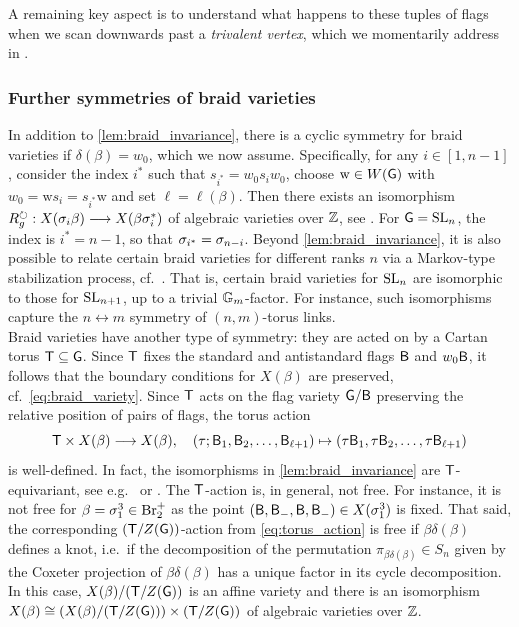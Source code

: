 A remaining key aspect is to understand what happens to these tuples of flags when we scan downwards past a {\it trivalent vertex}, which we momentarily address in . 

\subsubsection{Further symmetries of braid varieties}\label{sssec:braid_variety_further_symmetries} In addition to \cref{lem:braid_invariance}, there is a cyclic symmetry for braid varieties if $\delta(\beta)=w_0$, which we now assume. Specifically, for any $i\in[1,n-1]$, consider the index $i^*$ such that $s_{i^*}=w_0s_iw_0$, choose $\mathrm{w}\in W(\mathsf{G})$ with $w_0=\mathrm{w}s_{i}=s_{i^*}\mathrm{w}$ and set $\ell=\ell(\beta)$. Then there exists an isomorphism $R_g^\circlearrowright:X(\sigma_i\beta)\longrightarrow X(\beta \sigma^*_i)$ of algebraic varieties over $\mathbb{Z}$, see \cite[Section 5.5]{CGGLSS25}. For $\mathsf{G}=\operatorname{SL}_n$, the index is $i^*=n-1$, so that $\sigma_{i^*}=\sigma_{n-i}$. Beyond \cref{lem:braid_invariance}, it is also possible to relate certain braid varieties for different ranks $n$ via a Markov-type stabilization process, cf.~\cite[Section 3.2]{CGGS2}. That is, certain braid varieties for $\operatorname{SL}_n$ are isomorphic to those for $\operatorname{SL}_{n+1}$, up to a trivial $\mathbb{G}_m$-factor. For instance, such isomorphisms capture the $n\leftrightarrow m$ symmetry of $(n,m)$-torus links.\\

Braid varieties have another type of symmetry: they are acted on by a Cartan torus $\mathsf{T}\subseteq\mathsf{G}$. Since $\mathsf{T}$ fixes the standard and antistandard flags $\mathsf{B}$ and $w_0\mathsf{B}$, it follows that the boundary conditions for $X(\beta)$ are preserved, cf.~\cref{eq:braid_variety}. Since $\mathsf{T}$ acts on the flag variety $\mathsf{G}/\mathsf{B}$ preserving the relative position of pairs of flags, the torus action
\begin{equation}\label{eq:torus_action}
\mathsf{T}\times X(\beta)\longrightarrow X(\beta),\quad (\tau;\mathsf{B}_1,\mathsf{B}_2,\dots, \mathsf{B}_{\ell+1})\mapsto (\tau\mathsf{B}_1,\tau\mathsf{B}_2,\dots, \tau\mathsf{B}_{\ell+1})
\end{equation}
is well-defined. In fact, the isomorphisms in \cref{lem:braid_invariance} are $\mathsf{T}$-equivariant, see e.g.~\cite[Section 2.2]{CGGJ24} or \cite[Section 4.5]{CGSS_clusterdeeploci}. The $\mathsf{T}$-action is, in general, not free. For instance, it is not free for $\beta=\sigma_1^3\in\mbox{Br}_2^+$ as the point $(\mathsf{B},\mathsf{B}_-,\mathsf{B},\mathsf{B}_-)\in X(\sigma_1^3)$ is fixed. That said, the corresponding $(\mathsf{T}/Z(\mathsf{G}))$-action from \cref{eq:torus_action} is free if $\beta\delta(\beta)$ defines a knot, i.e.~if the decomposition of the permutation $\pi_{\beta\delta(\beta)}\in S_n$ given by the Coxeter projection of $\beta\delta(\beta)$ has a unique factor in its cycle decomposition. In this case, $X(\beta)/(\mathsf{T}/Z(\mathsf{G}))$ is an affine variety and there is an isomorphism $X(\beta)\cong \left(X(\beta)/(\mathsf{T}/Z(\mathsf{G}))\right )\times(\mathsf{T}/Z(\mathsf{G}))$ of algebraic varieties over $\mathbb{Z}$.

